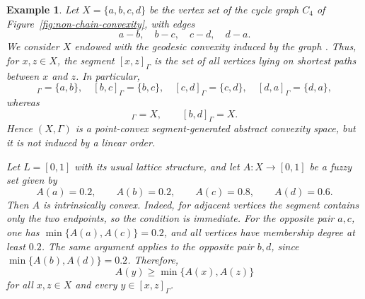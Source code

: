 \documentclass[11pt,a4paper]{article}
\newtheorem{example}{Example}
\begin{document}
\begin{example}\label{ex:non-chain-domain}
Let \(X=\{a,b,c,d\}\) be the vertex set of the cycle graph \(C_4\) of Figure~\ref{fig:non-chain-convexity}, with edges
\begin{equation*}
a-b,\quad b-c,\quad c-d,\quad d-a.
\end{equation*}
We consider \(X\) endowed with the geodesic convexity induced by the graph \citep{FarberJamison1987}. Thus, for \(x,z\in X\), the segment \([x,z]_{\Gamma}\) is the set of all vertices lying on shortest paths between \(x\) and \(z\). In particular,
\begin{equation*}
[a,b]_{\Gamma}=\{a,b\},\quad [b,c]_{\Gamma}=\{b,c\},\quad
[c,d]_{\Gamma}=\{c,d\},\quad [d,a]_{\Gamma}=\{d,a\},
\end{equation*}
whereas
\begin{equation*}
[a,c]_{\Gamma}=X,\qquad [b,d]_{\Gamma}=X.
\end{equation*}
Hence \((X,\Gamma)\) is a point-convex segment-generated abstract convexity space, but it is not induced by a linear order.

Let \(L=[0,1]\) with its usual lattice structure, and let \(A:X\to[0,1]\) be a fuzzy set given by
\begin{equation*}
A(a)=0.2,\qquad A(b)=0.2,\qquad A(c)=0.8,\qquad A(d)=0.6.
\end{equation*}
Then \(A\) is intrinsically convex. Indeed, for adjacent vertices the segment contains only the two endpoints, so the condition is immediate. For the opposite pair \(a,c\), one has \(\min\{A(a),A(c)\}=0.2\), and all vertices have membership degree at least \(0.2\). The same argument applies to the opposite pair \(b,d\), since \(\min\{A(b),A(d)\}=0.2\). Therefore,
\begin{equation*}
A(y)\geq \min\{A(x),A(z)\}
\end{equation*}
for all \(x,z\in X\) and every \(y\in[x,z]_{\Gamma}\).

\begin{figure}[htbp]
\centering
{}
\end{figure}
\end{example}
\end{document}
